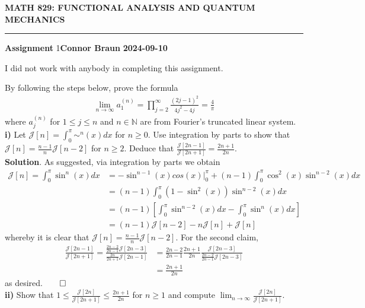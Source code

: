 \documentclass[10pt]{article}
\newcommand{\mbb}[1]{\mathbb{#1}}
\newcommand{\1}[1]{\mathbbm{1}_{#1}}
\newcommand{\mc}[1]{\mathcal{#1}}
\begin{document}
    \begin{center}
        {\bf\large{MATH 829: FUNCTIONAL ANALYSIS AND QUANTUM MECHANICS}}
        \smallskip
        \hrule
        \smallskip
        {\bf Assignment} 1\hfill {\bf Connor Braun} \hfill {\bf 2024-09-10}
    \end{center}
    \vspace{5pt}
    \begin{center}
        \begin{minipage}{\dimexpr\paperwidth-10cm}
            I did not work with anybody in completing this assignment.
        \end{minipage}
    \end{center}
     By following the steps below, prove the formula
    \begin{align}
        \lim_{n\rightarrow\infty}a_1^{(n)}=\prod_{j=2}^\infty\frac{(2j-1)^2}{4j^2-4j}=\frac{4}{\pi}\label{eq1}
    \end{align}
    where $a^{(n)}_j$ for $1\leq j\leq n$ and $n\in\mbb{N}$ are from Fourier's truncated linear system.\\[5pt]
    {\bf i)} Let $\mc{J}[n]=\int_0^\pi\sim^n(x)dx$ for $n\geq 0$. Use integration by parts to show that $\mc{J}[n]=\frac{n-1}{n}\mc{J}[n-2]$
    for $n\geq 2$. Deduce that $\tfrac{\mc{J}[2n-1]}{\mc{J}[2n+1]}=\tfrac{2n+1}{2n}$.\\[5pt]
    {\bf Solution}. As suggested, via integration by parts we obtain
    \begin{align*}
        \mc{J}[n]=\int_0^\pi\sin^n(x)dx&=-\sin^{n-1}(x)cos(x)\bigg|^\pi_0+(n-1)\int_0^\pi\cos^2(x)\sin^{n-2}(x)dx\\
        &=(n-1)\int_0^\pi(1-\sin^2(x))\sin^{n-2}(x)dx\\
        &=(n-1)\left[\int_0^\pi\sin^{n-2}(x)dx-\int_0^\pi\sin^n(x)dx\right]\\
        &=(n-1)\mc{J}[n-2]-n\mc{J}[n]+\mc{J}[n]
    \end{align*}
    whereby it is clear that $\mc{J}[n]=\tfrac{n-1}{n}\mc{J}[n-2]$. For the second claim,
    \begin{align*}
        \frac{\mc{J}[2n-1]}{\mc{J}[2n+1]}=\frac{\tfrac{2n-2}{2n-1}\mc{J}[2n-3]}{\tfrac{2n}{2n+1}\mc{J}[2n-1]}&=\frac{2n-2}{2n-1}\frac{2n+1}{2n}\frac{\mc{J}[2n-3]}{\tfrac{2n-2}{2n-1}\mc{J}[2n-3]}\\
        &=\frac{2n+1}{2n}
    \end{align*}
    as desired.\hfill{$\qed$}\\[5pt]
    {\bf ii)} Show that $1\leq \frac{\mc{J}[2n]}{\mc{J}[2n+1]}\leq\frac{2n+1}{2n}$ for $n\geq 1$ and compute $\lim_{n\rightarrow\infty}\frac{\mc{J}[2n]}{\mc{J}[2n+1]}$.\\[5pt]
\end{document}
